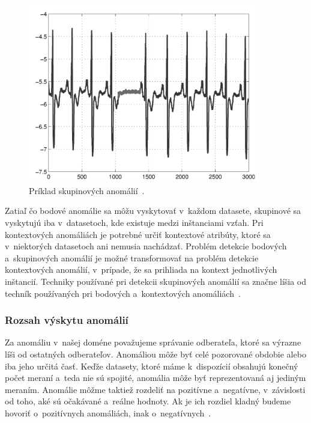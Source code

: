 \documentclass[a4paper,twoside,slovak,12pt,appendix]{article}
\begin{document}
\begin{figure}[H]
  \centering
  \includegraphics[width=0.9\textwidth]{collective_anomalies.png}
  \caption{Príklad skupinových anomálií~\cite{Chandola2009}.}
  \label{fig:collective-anomalies}
\end{figure}

\noindent
Zatiaľ čo bodové anomálie sa môžu vyskytovať v~každom datasete, skupinové sa
vyskytujú iba v~datasetoch, kde existuje medzi inštanciami vzťah. Pri
kontextových anomáliách je potrebné určiť kontextové atribúty, ktoré sa
v~niektorých datasetoch ani nemusia nachádzať. Problém detekcie bodových
a~skupinových anomálií je možné transformovať na problém detekcie kontextových
anomálií, v~prípade, že sa prihliada na kontext jednotlivých inštancií. Techniky
používané pri detekcii skupinových anomálií sa značne líšia od techník
používaných pri bodových a~kontextových anomáliách~\cite{Chandola2009}.


\subsubsection{Rozsah výskytu anomálií}
Za anomáliu v~našej doméne považujeme správanie odberateľa, ktoré sa výrazne
líši od ostatných odberateľov. Anomáliou môže byť celé pozorované obdobie alebo
iba jeho určitá časť. Keďže datasety, ktoré máme k~dispozícií obsahujú konečný
počet meraní a~teda nie sú spojité, anomália môže byť reprezentovaná aj jediným
meraním. Anomálie môžme taktiež rozdeliť na pozitívne a~negatívne, v~závislosti
od toho, aké sú očakávané a~reálne hodnoty. Ak je ich rozdiel kladný budeme
hovoriť o~pozitívnych anomáliách, inak o~negatívnych~\cite{Kejariwal2015}.
\end{document}
